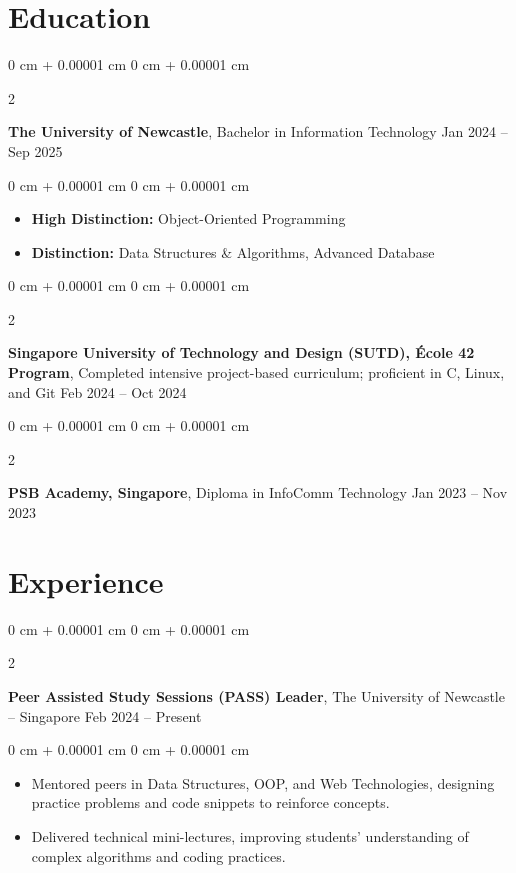\documentclass[10pt, letterpaper]{article}
\newenvironment{highlights}{
    \begin{itemize}[
        topsep=0.10 cm,
        parsep=0.10 cm,
        partopsep=0pt,
        itemsep=0pt,
        leftmargin=0 cm + 10pt
    ]
}{
    \end{itemize}
} %
\newenvironment{onecolentry}{
    \begin{adjustwidth}{
        0 cm + 0.00001 cm
    }{
        0 cm + 0.00001 cm
    }
}{
    \end{adjustwidth}
} %
\newenvironment{twocolentry}[2][]{
    \onecolentry
    \def\secondColumn{#2}
    \setcolumnwidth{\fill, 4.5 cm}
    \begin{paracol}{2}
}{
    \switchcolumn \raggedleft \secondColumn
    \end{paracol}
    \endonecolentry
} %
\begin{document}
    \section{Education}
        \begin{twocolentry}{
            Jan 2024 – Sep 2025
        }
        \textbf{The University of Newcastle}, Bachelor in Information Technology\end{twocolentry}
        \vspace{0.10 cm}
        \begin{onecolentry}
            \begin{highlights}
                \item \textbf{High Distinction:} Object-Oriented Programming
            \end{highlights}
            \begin{highlights}
                \item \textbf{Distinction:} Data Structures \& Algorithms, Advanced Database
            \end{highlights}
        \end{onecolentry}
        
        \vspace{0.20 cm}
        \begin{twocolentry}{
                Feb 2024 – Oct 2024
            }
            \textbf{Singapore University of Technology and Design (SUTD), École 42 Program}, Completed intensive project-based curriculum; proficient in C, Linux, and Git \end{twocolentry}

        \vspace{0.20 cm}
        \begin{twocolentry}{
                Jan 2023 – Nov 2023
            }
            \textbf{PSB Academy, Singapore}, Diploma in InfoComm Technology\end{twocolentry}


        \section{Experience}        
                \begin{twocolentry}{
                    Feb 2024 – Present
                }
                    \textbf{Peer Assisted Study Sessions (PASS) Leader}, The University of Newcastle -- Singapore \end{twocolentry}
                \vspace{0.10 cm}
                \begin{onecolentry}
                    \begin{highlights}
                        \item Mentored peers in Data Structures, OOP, and Web Technologies, designing practice problems and code snippets to reinforce concepts.
                        \item Delivered technical mini-lectures, improving students’ understanding of complex algorithms and coding practices.
                    \end{highlights}
                \end{onecolentry}
                
\end{document}
